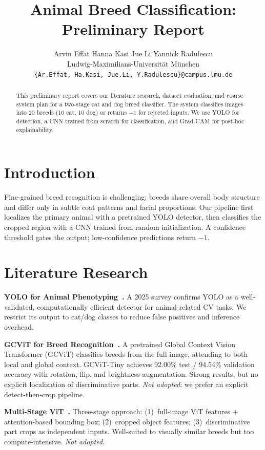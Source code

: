 \documentclass[10pt,twocolumn,letterpaper]{article}
\title{\vspace{-0.6cm}\textbf{Animal Breed Classification: Preliminary Report}}
\author{
  Arvin Effat \quad Hanna Kasi \quad Jue Li \quad Yannick Radulescu \\[1pt]
  Ludwig-Maximilians-Universit\"{a}t M\"{u}nchen \\[1pt]
  \small\texttt{\{Ar.Effat, Ha.Kasi, Jue.Li, Y.Radulescu\}@campus.lmu.de}
}
\date{}
\begin{document}
\maketitle
\thispagestyle{fancy}

\begin{abstract}
\small
This preliminary report covers our literature research, dataset evaluation, and coarse system plan for a two-stage cat and dog breed classifier. The system classifies images into 20 breeds (10 cat, 10 dog) or returns $-1$ for rejected inputs. We use YOLO for detection, a CNN trained from scratch for classification, and Grad-CAM for post-hoc explainability.
\end{abstract}

\section{Introduction}

Fine-grained breed recognition is challenging: breeds share overall body structure and differ only in subtle coat patterns and facial proportions. Our pipeline first localizes the primary animal with a pretrained YOLO detector, then classifies the cropped region with a CNN trained from random initialization. A confidence threshold gates the output; low-confidence predictions return $-1$.

\section{Literature Research}

\textbf{YOLO for Animal Phenotyping~\cite{yolo_animal_2025}.}
A 2025 survey confirms YOLO as a well-validated, computationally efficient detector for animal-related CV tasks. We restrict its output to cat/dog classes to reduce false positives and inference overhead.

\textbf{GCViT for Breed Recognition~\cite{gcvit_2026}.}
A pretrained Global Context Vision Transformer (GCViT) classifies breeds from the full image, attending to both local and global context. GCViT-Tiny achieves 92.00\% test / 94.54\% validation accuracy with rotation, flip, and brightness augmentation. Strong results, but no explicit localization of discriminative parts. \textit{Not adopted}: we prefer an explicit detect-then-crop pipeline.

\textbf{Multi-Stage ViT~\cite{transfg_2021}.}
Three-stage approach: (1)~full-image ViT features + attention-based bounding box; (2)~cropped object features; (3)~discriminative part crops as independent inputs. Well-suited to visually similar breeds but too compute-intensive. \textit{Not adopted.}
\end{document}
